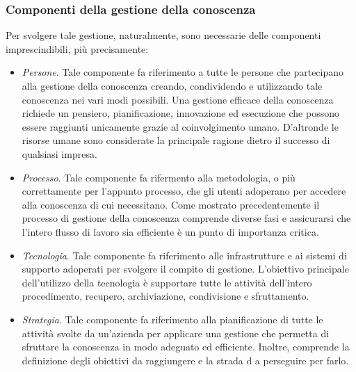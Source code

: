 \subsubsection{Componenti della gestione della conoscenza}

Per svolgere tale gestione, naturalmente, sono necessarie delle componenti imprescindibili, più precisamente:\cite{knowledge_management_components}

\begin{itemize}
    \item \textit{Persone}. Tale componente fa riferimento a tutte le persone che partecipano alla gestione della conoscenza creando, condividendo e utilizzando tale conoscenza nei vari modi possibili. Una gestione efficace della conoscenza richiede un pensiero, pianificazione, innovazione ed esecuzione che possono essere raggiunti unicamente grazie al coinvolgimento umano. D'altronde le risorse umane sono considerate la principale ragione dietro il successo di qualsiasi impresa.
    \item \textit{Processo}. Tale componente fa rifermento alla metodologia, o più correttamente per l’appunto processo, che gli utenti adoperano per accedere alla conoscenza di cui necessitano. Come mostrato precedentemente il processo di gestione della conoscenza comprende diverse fasi e assicurarsi che l’intero flusso di lavoro sia efficiente è un punto di importanza critica.
    \item \textit{Tecnologia}. Tale componente fa riferimento alle infrastrutture e ai sistemi di supporto adoperati per svolgere il compito di gestione. L’obiettivo principale dell'utilizzo della tecnologia è supportare tutte le attività dell'intero procedimento, recupero, archiviazione, condivisione e sfruttamento.
    \item \textit{Strategia}. Tale componente fa riferimento alla pianificazione di tutte le attività svolte da un’azienda per applicare una gestione che permetta di sfruttare la conoscenza in modo adeguato ed efficiente. Inoltre, comprende la definizione degli obiettivi da raggiungere e la strada d    a perseguire per farlo.
\end{itemize}


